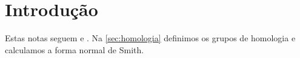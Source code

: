 \section{Introdução}\label{sec:intro}

Estas notas seguem \cite{hatcher2002} e \cite{munkres1984}. Na \cref{sec:homologia}
definimos os grupos de homologia e calculamos a forma normal de Smith.

